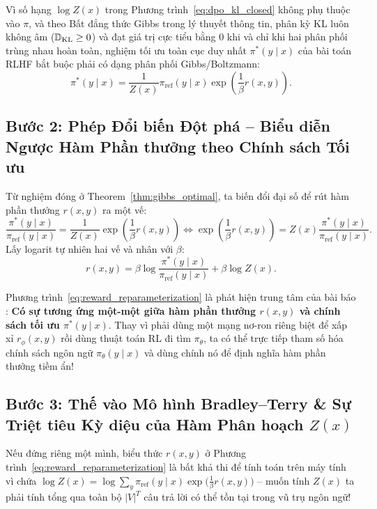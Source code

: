 \begin{theorem}
\label{thm:gibbs_optimal}
Vì số hạng $\log Z(x)$ trong Phương trình~\eqref{eq:dpo_kl_closed} không phụ thuộc vào $\pi$, và theo Bất đẳng thức Gibbs trong lý thuyết thông tin, phân kỳ KL luôn không âm ($\operatorname{\mathbb{D}_{\mathrm{KL}}} \ge 0$) và đạt giá trị cực tiểu bằng $0$ khi và chỉ khi hai phân phối trùng nhau hoàn toàn, nghiệm tối ưu toàn cục duy nhất $\pi^*(y \mid x)$ của bài toán RLHF bắt buộc phải có dạng phân phối Gibbs/Boltzmann:
\begin{equation}
    \pi^*(y \mid x) = \frac{1}{Z(x)} \pi_{\text{ref}}(y \mid x) \exp\left( \frac{1}{\beta} r(x, y) \right).
\end{equation}
\end{theorem}

\subsection{Bước 2: Phép Đổi biến Đột phá -- Biểu diễn Ngược Hàm Phần thưởng theo Chính sách Tối ưu}
Từ nghiệm đóng ở Theorem~\ref{thm:gibbs_optimal}, ta biến đổi đại số để rút hàm phần thưởng $r(x, y)$ ra một vế:
\begin{equation}
    \frac{\pi^*(y \mid x)}{\pi_{\text{ref}}(y \mid x)} = \frac{1}{Z(x)} \exp\left( \frac{1}{\beta} r(x, y) \right) \iff \exp\left( \frac{1}{\beta} r(x, y) \right) = Z(x) \frac{\pi^*(y \mid x)}{\pi_{\text{ref}}(y \mid x)}.
\end{equation}
Lấy logarit tự nhiên hai vế và nhân với $\beta$:
\begin{equation}
    r(x, y) = \beta \log \frac{\pi^*(y \mid x)}{\pi_{\text{ref}}(y \mid x)} + \beta \log Z(x).
    \label{eq:reward_reparameterization}
\end{equation}

\begin{pedagogy}
Phương trình~\eqref{eq:reward_reparameterization} là phát hiện trung tâm của bài báo \citet{rafailov2023direct}: \textbf{Có sự tương ứng một-một giữa hàm phần thưởng $r(x, y)$ và chính sách tối ưu $\pi^*(y \mid x)$}.
Thay vì phải dùng một mạng nơ-ron riêng biệt để xấp xỉ $r_\phi(x, y)$ rồi dùng thuật toán RL đi tìm $\pi_\theta$, ta có thể trực tiếp tham số hóa chính sách ngôn ngữ $\pi_\theta(y \mid x)$ và dùng chính nó để định nghĩa hàm phần thưởng tiềm ẩn!
\end{pedagogy}

\subsection{Bước 3: Thế vào Mô hình Bradley--Terry \& Sự Triệt tiêu Kỳ diệu của Hàm Phân hoạch $Z(x)$}
Nếu đứng riêng một mình, biểu thức $r(x, y)$ ở Phương trình~\eqref{eq:reward_reparameterization} là bất khả thi để tính toán trên máy tính vì chứa $\log Z(x) = \log \sum_{y} \pi_{\text{ref}}(y \mid x) \exp\big(\frac{1}{\beta} r(x, y)\big)$ -- muốn tính $Z(x)$ ta phải tính tổng qua toàn bộ $|V|^T$ câu trả lời có thể tồn tại trong vũ trụ ngôn ngữ!

